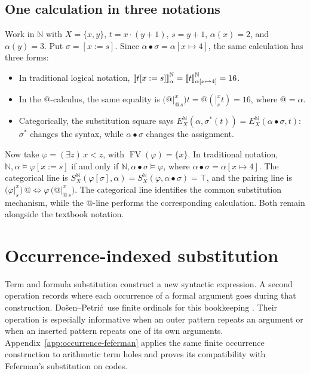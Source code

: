 \documentclass[11pt]{article}
\makeatletter
\newcommand{\llbracket}{\mathopen{[\mkern-3mu[}}
\newcommand{\rrbracket}{\mathclose{]\mkern-3mu]}}
\newcommand{\atsign}{\mathord{@}}
\newcommand{\DP}{Do\v{s}en--Petri\'{c}}
\newcommand{\tightlist}{\setlength{\itemsep}{0pt}%
  \setlength{\parskip}{0pt}}
\theoremstyle{definition}
\makeatother
\begin{document}
\subsection{One calculation in three notations}

Work in \(\mathbb N\) with \(X=\{x,y\}\), \(t=x\cdot(y+1)\),
\(s=y+1\), \(\alpha(x)=2\), and \(\alpha(y)=3\). Put
\(\sigma=[x:=s]\). Since \(\alpha\bullet\sigma=\alpha[x\mapsto4]\), the
same calculation has three forms:

\begin{itemize}
\tightlist
\item
  In traditional logical notation,
  \(\llbracket t[x:=s]\rrbracket^{\mathbb N}_\alpha=
  \llbracket t\rrbracket^{\mathbb N}_{\alpha[x\mapsto4]}=16\).
\item
  In the $\atsign$-calculus, the same equality is
  \(\bigl(\atsign\vert_{\atsign\,s}^x\bigr)t
  =\atsign(\vert_s^x t)=16\), where \(\atsign=\alpha\).
\item
  Categorically, the substitution square says
  \(E_X^{\mathbb N}(\alpha,\sigma^*(t))=
  E_X^{\mathbb N}(\alpha\bullet\sigma,t)\): \(\sigma^*\) changes the syntax,
  while \(\alpha\bullet\sigma\) changes the assignment.
\end{itemize}

Now take \(\varphi=(\exists z)\,x<z\), with
\(\operatorname{FV}(\varphi)=\{x\}\). In traditional notation,
\(\mathbb N,\alpha\models\varphi[x:=s]\) if and only if
\(\mathbb N,\alpha\bullet\sigma\models\varphi\), where
\(\alpha\bullet\sigma=\alpha[x\mapsto4]\). The categorical line is
\(S_X^{\mathbb N}(\varphi[\sigma],\alpha)=
S_X^{\mathbb N}(\varphi,\alpha\bullet\sigma)=\top\), and the pairing line is
\(\bigl(\varphi\vert_s^x\bigr)\,\atsign\Longleftrightarrow
\varphi\,\bigl(\atsign\vert_{\atsign\,s}^x\bigr)\). The categorical line identifies the common
substitution mechanism, while the $\atsign$-line performs the corresponding
calculation. Both remain alongside the textbook notation.

\section{Occurrence-indexed substitution}
\label{occurrence-indexed-substitution}

Term and formula substitution construct a new syntactic expression. A second
operation records where each occurrence of a formal argument goes during that
construction. \DP\ use finite ordinals for this bookkeeping
\cite[\S2.5, pp.~45--46]{DPcoherence}. Their operation is especially informative
when an outer pattern repeats an argument or when an inserted pattern repeats
one of its own arguments. Appendix~\ref{app:occurrence-feferman}
applies the same finite occurrence construction to arithmetic term holes
and proves its compatibility with Feferman's substitution on codes.
\end{document}
